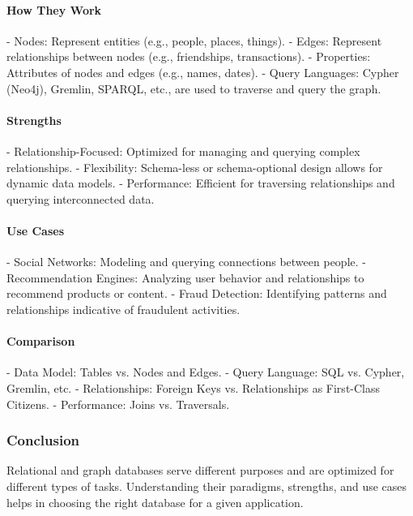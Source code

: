 \paragraph{How They Work}
- Nodes: Represent entities (e.g., people, places, things).
- Edges: Represent relationships between nodes (e.g., friendships, transactions).
- Properties: Attributes of nodes and edges (e.g., names, dates).
- Query Languages: Cypher (Neo4j), Gremlin, SPARQL, etc., are used to traverse and query the graph.

\paragraph{Strengths}
- Relationship-Focused: Optimized for managing and querying complex relationships.
- Flexibility: Schema-less or schema-optional design allows for dynamic data models.
- Performance: Efficient for traversing relationships and querying interconnected data.

\paragraph{Use Cases}
- Social Networks: Modeling and querying connections between people.
- Recommendation Engines: Analyzing user behavior and relationships to recommend products or content.
- Fraud Detection: Identifying patterns and relationships indicative of fraudulent activities.

\paragraph{Comparison}
- Data Model: Tables vs. Nodes and Edges.
- Query Language: SQL vs. Cypher, Gremlin, etc.
- Relationships: Foreign Keys vs. Relationships as First-Class Citizens.
- Performance: Joins vs. Traversals.

\subsubsection{Conclusion}
Relational and graph databases serve different purposes and are optimized for different types of tasks. Understanding their paradigms, strengths, and use cases helps in choosing the right database for a given application.